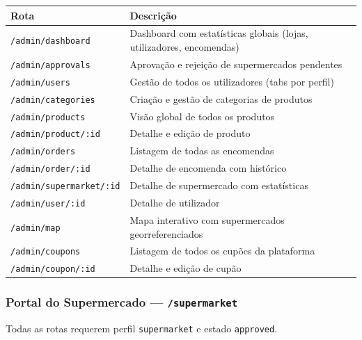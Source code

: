 \documentclass[12pt,a4paper]{article}
\begin{document}
\begin{center}
\begin{tabular}{ll}
\toprule
\textbf{Rota} & \textbf{Descrição} \\
\midrule
\texttt{/admin/dashboard}           & Dashboard com estatísticas globais (lojas, utilizadores, encomendas) \\
\texttt{/admin/approvals}           & Aprovação e rejeição de supermercados pendentes \\
\texttt{/admin/users}               & Gestão de todos os utilizadores (tabs por perfil) \\
\texttt{/admin/categories}          & Criação e gestão de categorias de produtos \\
\texttt{/admin/products}            & Visão global de todos os produtos \\
\texttt{/admin/product/:id}         & Detalhe e edição de produto \\
\texttt{/admin/orders}              & Listagem de todas as encomendas \\
\texttt{/admin/order/:id}           & Detalhe de encomenda com histórico \\
\texttt{/admin/supermarket/:id}     & Detalhe de supermercado com estatísticas \\
\texttt{/admin/user/:id}            & Detalhe de utilizador \\
\texttt{/admin/map}                 & Mapa interativo com supermercados georreferenciados \\
\texttt{/admin/coupons}             & Listagem de todos os cupões da plataforma \\
\texttt{/admin/coupon/:id}          & Detalhe e edição de cupão \\
\bottomrule
\end{tabular}
\end{center}

\subsubsection{Portal do Supermercado --- \texttt{/supermarket}}

Todas as rotas requerem perfil \texttt{supermarket} e estado \texttt{approved}.
\end{document}
